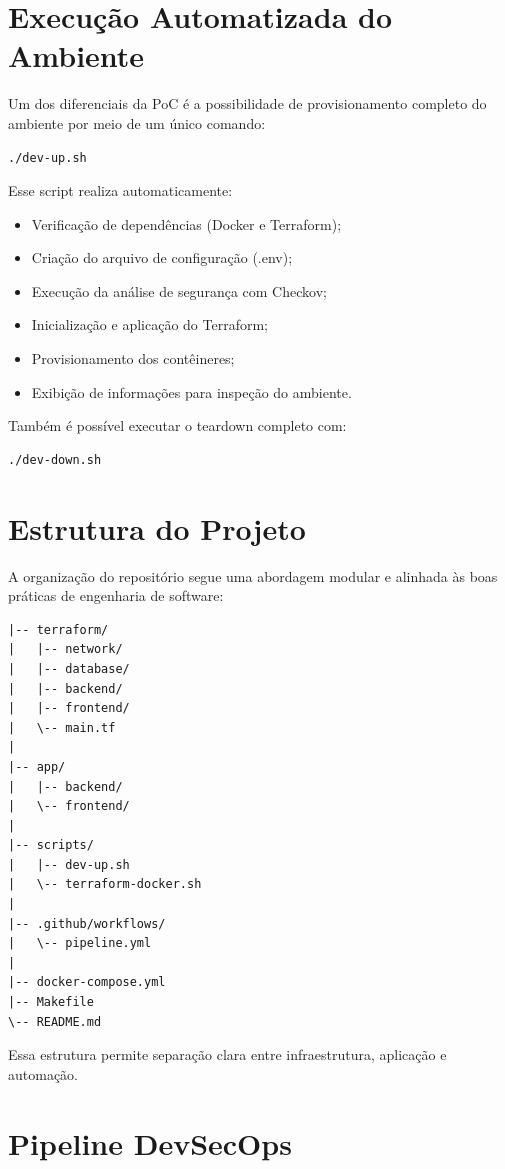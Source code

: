 \section{Execução Automatizada do Ambiente}

Um dos diferenciais da PoC é a possibilidade de provisionamento completo do ambiente por meio de um único comando:

\begin{verbatim}
./dev-up.sh
\end{verbatim}

Esse script realiza automaticamente:

\begin{itemize}
\item Verificação de dependências (Docker e Terraform);
\item Criação do arquivo de configuração (.env);
\item Execução da análise de segurança com Checkov;
\item Inicialização e aplicação do Terraform;
\item Provisionamento dos contêineres;
\item Exibição de informações para inspeção do ambiente.
\end{itemize}

Também é possível executar o teardown completo com:

\begin{verbatim}
./dev-down.sh
\end{verbatim}

\section{Estrutura do Projeto}

A organização do repositório segue uma abordagem modular e alinhada às boas práticas de engenharia de software:

\begin{verbatim}
|-- terraform/
|   |-- network/
|   |-- database/
|   |-- backend/
|   |-- frontend/
|   \-- main.tf
|
|-- app/
|   |-- backend/
|   \-- frontend/
|
|-- scripts/
|   |-- dev-up.sh
|   \-- terraform-docker.sh
|
|-- .github/workflows/
|   \-- pipeline.yml
|
|-- docker-compose.yml
|-- Makefile
\-- README.md
\end{verbatim}

Essa estrutura permite separação clara entre infraestrutura, aplicação e automação.

\section{Pipeline DevSecOps}

